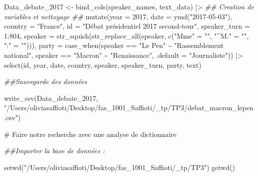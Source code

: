 \documentclass[
  letterpaper,
  DIV=11,
  numbers=noendperiod]{scrartcl}
\newenvironment{Shaded}{\begin{snugshade}}{\end{snugshade}}
\newcommand{\AttributeTok}[1]{\textcolor[rgb]{0.40,0.45,0.13}{#1}}
\newcommand{\CommentTok}[1]{\textcolor[rgb]{0.37,0.37,0.37}{#1}}
\newcommand{\DecValTok}[1]{\textcolor[rgb]{0.68,0.00,0.00}{#1}}
\newcommand{\DocumentationTok}[1]{\textcolor[rgb]{0.37,0.37,0.37}{\textit{#1}}}
\newcommand{\FunctionTok}[1]{\textcolor[rgb]{0.28,0.35,0.67}{#1}}
\newcommand{\NormalTok}[1]{\textcolor[rgb]{0.00,0.23,0.31}{#1}}
\newcommand{\OtherTok}[1]{\textcolor[rgb]{0.00,0.23,0.31}{#1}}
\newcommand{\SpecialCharTok}[1]{\textcolor[rgb]{0.37,0.37,0.37}{#1}}
\newcommand{\StringTok}[1]{\textcolor[rgb]{0.13,0.47,0.30}{#1}}
\begin{document}
\begin{Shaded}
\begin{Highlighting}[]
\NormalTok{Data\_debate\_2017 }\OtherTok{\textless{}{-}} \FunctionTok{bind\_cols}\NormalTok{(speaker\_names, text\_data) }\SpecialCharTok{|\textgreater{}} 
  \DocumentationTok{\#\# Creation de variables et nettoyage \#\#}
  \FunctionTok{mutate}\NormalTok{(}\AttributeTok{year         =} \DecValTok{2017}\NormalTok{, }
         \AttributeTok{date         =} \FunctionTok{ymd}\NormalTok{(}\StringTok{"2017{-}05{-}03"}\NormalTok{), }
         \AttributeTok{country      =} \StringTok{"France"}\NormalTok{, }
         \AttributeTok{id           =} \StringTok{"Débat présidentiel 2017 second{-}tour"}\NormalTok{,}
         \AttributeTok{speaker\_turn =} \DecValTok{1}\SpecialCharTok{:}\DecValTok{804}\NormalTok{,}
         \AttributeTok{speaker =} \FunctionTok{str\_squish}\NormalTok{(}\FunctionTok{str\_replace\_all}\NormalTok{(speaker, }\FunctionTok{c}\NormalTok{(}\StringTok{"Mme"} \OtherTok{=} \StringTok{""}\NormalTok{,}
                                                         \StringTok{"\^{}M."} \OtherTok{=} \StringTok{""}\NormalTok{,}
                                                         \StringTok{":"}   \OtherTok{=} \StringTok{""}\NormalTok{))),}
         \AttributeTok{party =} \FunctionTok{case\_when}\NormalTok{(speaker }\SpecialCharTok{==} \StringTok{"Le Pen"} \SpecialCharTok{\textasciitilde{}} \StringTok{"Rassemblement national"}\NormalTok{,}
\NormalTok{                           speaker }\SpecialCharTok{==} \StringTok{"Macron"} \SpecialCharTok{\textasciitilde{}} \StringTok{"Renaissance"}\NormalTok{,}
                           \AttributeTok{.default =} \StringTok{"Journaliste"}\NormalTok{)) }\SpecialCharTok{|\textgreater{}} 
  \FunctionTok{select}\NormalTok{(id, year, date, country, speaker, speaker\_turn, party, text)}

\DocumentationTok{\#\#Sauvegarde des données}

\FunctionTok{write\_csv}\NormalTok{(Data\_debate\_2017, }\StringTok{"/Users/oliviasaffioti/Desktop/fas\_1001\_Saffioti/\_tp/TP3/debat\_macron\_lepen.csv"}\NormalTok{)}
\end{Highlighting}
\end{Shaded}

\begin{Shaded}
\begin{Highlighting}[]
\CommentTok{\# Faire notre recherche avec une analyse de dictionnaire}

\DocumentationTok{\#\#Importer la base de données : }

\FunctionTok{setwd}\NormalTok{(}\StringTok{"/Users/oliviasaffioti/Desktop/fas\_1001\_Saffioti/\_tp/TP3"}\NormalTok{)}
\FunctionTok{getwd}\NormalTok{()}
\end{Highlighting}
\end{Shaded}
\end{document}
